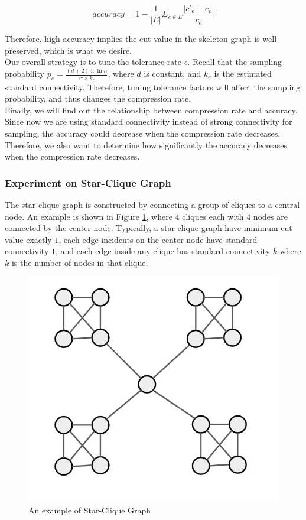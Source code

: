 \documentclass{article}
\begin{document}
\begin{equation}
    accuracy = 1 - \frac{1}{|E|} \Sigma_{e \in E} \frac{|c'_e - c_e|}{c_e}
\end{equation}

Therefore, high accuracy implies the cut value in the skeleton graph is well-preserved, which is what we desire. \\

Our overall strategy is to tune the tolerance rate $\epsilon$. Recall that the sampling probability $p_e = \frac{(d+2) \times \ln{n}}{\epsilon^2 \times k_e}$, where $d$ is constant, and $k_e$ is the estimated standard connectivity. Therefore, tuning tolerance factors will affect the sampling probability, and thus changes the compression rate. \\

Finally, we will find out the relationship between compression rate and accuracy. Since now we are using standard connectivity instead of strong connectivity for sampling, the accuracy could decrease when the compression rate decreases. Therefore, we also want to determine how significantly the accuracy decreases when the compression rate decreases. 
\bigskip

\subsubsection{Experiment on Star-Clique Graph}
The star-clique graph is constructed by connecting a group of cliques to a central node. An example is shown in Figure \ref{fig:StarClique}, where 4 cliques each with 4 nodes are connected by the center node. Typically, a star-clique graph have minimum cut value exactly $1$, each edge incidents on the center node have standard connectivity $1$, and each edge inside any clique has standard connectivity $k$ where $k$ is the number of nodes in that clique.

\begin{figure}[h!]
\centering
\includegraphics[scale=0.2]{images/starClique.jpg}
\caption{An example of Star-Clique Graph}
\label{fig:StarClique}
\end{figure}
\end{document}
